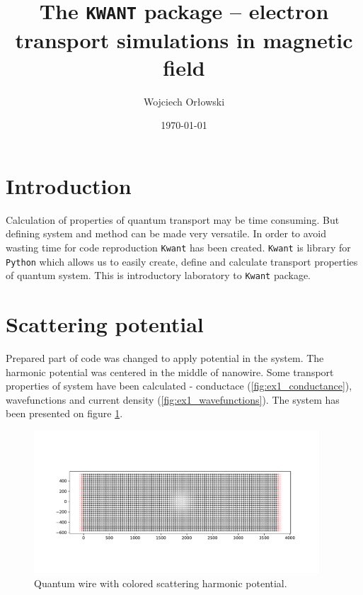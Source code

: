 \documentclass[12pt, a4paper]{article}
\author{Wojciech Orłowski}
\title{The \texttt{KWANT} package – electron transport simulations in magnetic field}
\date{\today}
\begin{document}
\maketitle

\section*{Introduction}

Calculation of properties of quantum transport may be time consuming.
But defining system and method can be made very versatile.
In order to avoid wasting time for code reproduction \texttt{Kwant} has been created.
\texttt{Kwant} is library for \texttt{Python} which allows us to easily create, define and calculate transport properties of quantum system.
This is introductory laboratory to \texttt{Kwant} package.

\section*{Scattering potential}

Prepared part of code was changed to apply potential in the system.
The harmonic potential was centered in the middle of nanowire.
Some transport properties of system have been calculated - conductace (\ref{fig:ex1_conductance}), wavefunctions and current density (\ref{fig:ex1_wavefunctions}).
The system has been presented on figure \ref{fig:ex1_system}.

\begin{figure}[h]
    \begin{center}
        \includegraphics[width=0.95\textwidth]{../plots/kwant_system_with_gauss.pdf}
    \end{center}
    \caption{Quantum wire with colored scattering harmonic potential.}\label{fig:ex1_system}
\end{figure}
\end{document}
